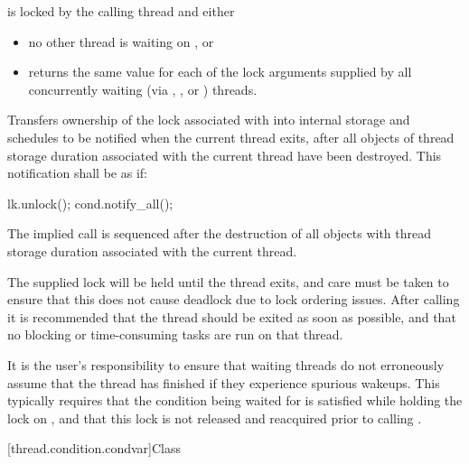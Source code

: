 \begin{itemdescr}
\pnum
\requires {} is locked by the calling thread and either

\begin{itemize}
\item no other thread is waiting on , or
\item {} returns the same value for each of the lock arguments
supplied by all concurrently waiting (via , ,
or ) threads.
\end{itemize}

\pnum
\effects Transfers ownership of the lock associated with  into
internal storage and schedules  to be notified when the current
thread exits, after all objects of thread storage duration associated with
the current thread have been destroyed. This notification shall be as if:
\begin{codeblock}
lk.unlock();
cond.notify_all();
\end{codeblock}

\pnum
\sync The implied  call is sequenced after the destruction of
all objects with thread storage duration associated with the current thread.

\pnum
\realnote The supplied lock will be held until the thread exits, and care
must be taken to ensure that this does not cause deadlock due to lock
ordering issues. After calling  it is
recommended that the thread should be exited as soon as possible, and
that no blocking or time-consuming tasks are run on that thread.

\pnum
\realnote It is the user's responsibility to ensure that waiting threads
do not erroneously assume that the thread has finished if they experience
spurious wakeups. This typically requires that the condition being waited
for is satisfied while holding the lock on , and that this lock
is not released and reacquired prior to calling .
\end{itemdescr}

[thread.condition.condvar]{Class }

